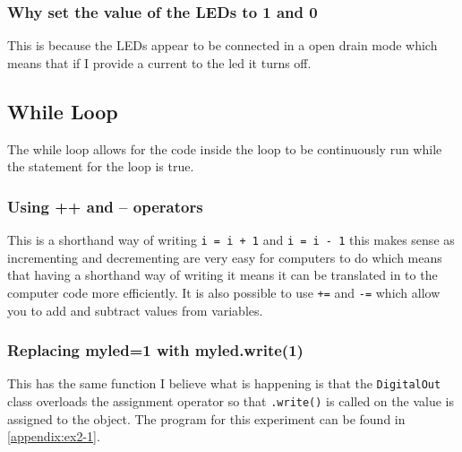 \documentclass[a4paper,12pt]{scrartcl}
\begin{document}
{{			\subsubsection{Why set the value of the LEDs to 1 and 0}
			{
				This is because the LEDs appear to be connected in a open drain mode which means that if I provide a current to the led it turns off.
			}
		}
		\subsection{While Loop}
		{
			The while loop allows for the code inside the loop to be continuously run while the statement for the loop is true.
			\subsubsection{Using ++ and -- operators}
			{
				This is a shorthand way of writing \lstinline|i = i + 1| and \lstinline|i = i - 1| this makes sense as incrementing and decrementing are very easy for computers to do which means that having a shorthand way of writing it means it can be translated in to the computer code more efficiently. It is also possible to use \lstinline|+=| and \lstinline|-=| which allow you to add and subtract values from variables.
			}
			\subsubsection{Replacing myled=1 with myled.write(1)}
			{
				This has the same function I believe what is happening is that the \lstinline|DigitalOut| class overloads the assignment operator so that \lstinline|.write()| is called on the value is assigned to the object. The program for this experiment can be found in \cref{appendix:ex2-1}.
			}
		}
}
\end{document}
